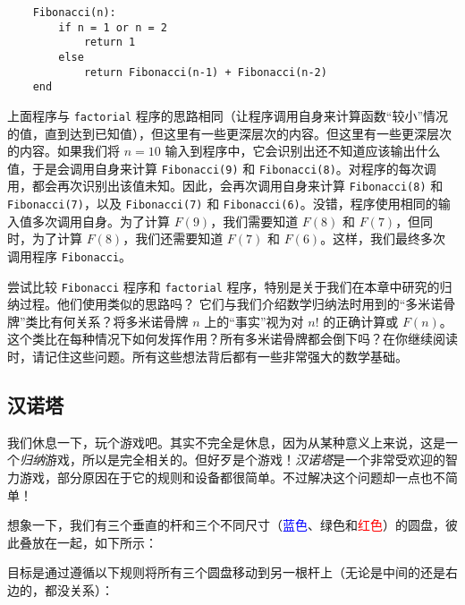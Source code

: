 \begin{verbatim}
    Fibonacci(n):
        if n = 1 or n = 2
            return 1
        else
            return Fibonacci(n-1) + Fibonacci(n-2)
    end
\end{verbatim}

上面程序与 \verb|factorial| 程序的思路相同（让程序调用自身来计算函数“较小”情况的值，直到达到已知值），但这里有一些更深层次的内容。但这里有一些更深层次的内容。如果我们将 $n = 10$ 输入到程序中，它会识别出还不知道应该输出什么值，于是会调用自身来计算 \verb|Fibonacci(9)| 和 \verb|Fibonacci(8)|。对程序的每次调用，都会再次识别出该值未知。因此，会再次调用自身来计算 \verb|Fibonacci(8)| 和 \verb|Fibonacci(7)|，以及 \verb|Fibonacci(7)| 和 \verb|Fibonacci(6)|。没错，程序使用相同的输入值多次调用自身。为了计算 $F(9)$，我们需要知道 $F(8)$ 和 $F(7)$，但同时，为了计算 $F(8)$，我们还需要知道 $F(7) $ 和 $F(6)$。这样，我们最终多次调用程序 \verb|Fibonacci|。

尝试比较 \verb|Fibonacci| 程序和 \verb|factorial| 程序，特别是关于我们在本章中研究的归纳过程。他们使用类似的思路吗？ 它们与我们介绍数学归纳法时用到的“多米诺骨牌”类比有何关系？将多米诺骨牌 $n$ 上的“事实”视为对 $n!$ 的正确计算或 $F(n)$。这个类比在每种情况下如何发挥作用？所有多米诺骨牌都会倒下吗？在你继续阅读时，请记住这些问题。所有这些想法背后都有一些非常强大的数学基础。

\clearpage

\subsection{汉诺塔}

我们休息一下，玩个游戏吧。其实不完全是休息，因为从某种意义上来说，这是一个\textit{归纳}游戏，所以是完全相关的。但好歹是个游戏！\textit{汉诺塔}是一个非常受欢迎的智力游戏，部分原因在于它的规则和设备都很简单。不过解决这个问题却一点也不简单！

想象一下，我们有三个垂直的杆和三个不同尺寸（\textcolor{blue}{蓝色}、\textcolor{olivegreen}{绿色}和\textcolor{red}{红色}）的圆盘，彼此叠放在一起，如下所示：

\begin{center}
\end{center}
目标是通过遵循以下规则将所有三个圆盘移动到另一根杆上（无论是中间的还是右边的，都没关系）：

